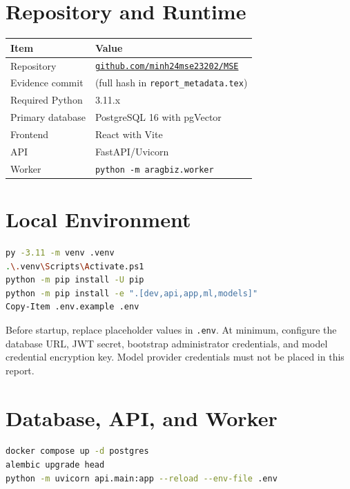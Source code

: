 
\section{Repository and Runtime}

\begin{longtable}{p{}p{}}
  \toprule
  Item & Value\\
  \midrule
  Repository & \href{\RepositoryURL}{\texttt{github.com/minh24mse23202/MSE}}\\
  Evidence commit & \Code{\EvidenceCommitShort} (full hash in
  \texttt{report\_metadata.tex})\\
  Required Python & 3.11.x\\
  Primary database & PostgreSQL 16 with pgVector\\
  Frontend & React with Vite\\
  API & FastAPI/Uvicorn\\
  Worker & \texttt{python -m aragbiz.worker}\\
  \bottomrule
\end{longtable}

\section{Local Environment}

\begin{lstlisting}[language=bash,caption={Windows PowerShell environment setup.}]
py -3.11 -m venv .venv
.\.venv\Scripts\Activate.ps1
python -m pip install -U pip
python -m pip install -e ".[dev,api,app,ml,models]"
Copy-Item .env.example .env
\end{lstlisting}

Before startup, replace placeholder values in \texttt{.env}. At minimum,
configure the database URL, JWT secret, bootstrap administrator credentials,
and model credential encryption key. Model provider credentials must not be
placed in this report.

\section{Database, API, and Worker}

\begin{lstlisting}[language=bash,caption={Starting the backend services.}]
docker compose up -d postgres
alembic upgrade head
python -m uvicorn api.main:app --reload --env-file .env
\end{lstlisting}

